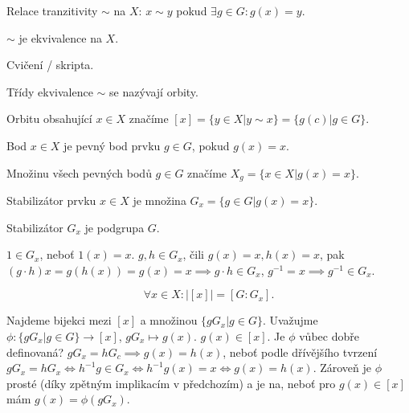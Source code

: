 \documentclass[12pt]{article}                   %
\begin{document}
        \begin{definice}
            Relace tranzitivity $\sim$ na $X$: $x \sim y$ pokud $\exists g \in G: g(x) = y$.
        \end{definice}

        \begin{lemma}
            $\sim$ je ekvivalence na $X$.

            \begin{dukazin}
                Cvičení / skripta.
            \end{dukazin}
        \end{lemma}

        \begin{definice}[Orbita]
            Třídy ekvivalence $\sim$ se nazývají orbity.

            Orbitu obsahující $x \in X$ značíme $[x] = \{y \in X | y \sim x\} = \{g(c) | g \in G\}$.
        \end{definice}

        \begin{definice}
            Bod $x \in X$ je pevný bod prvku $g \in G$, pokud $g(x) = x$.

            Množinu všech pevných bodů $g \in G$ značíme $X_g = \{x \in X | g(x) = x\}$.

            Stabilizátor prvku $x \in X$ je množina $G_x = \{g \in G | g(x) = x\}$.
        \end{definice}

        \begin{lemma}
            Stabilizátor $G_x$ je podgrupa $G$.

            \begin{dukazin}
                $1 \in G_x$, neboť $1(x) = x$. $g, h \in G_x$, čili $g(x) = x, h(x) = x$, pak $(g·h)x = g(h(x)) = g(x) = x \implies g·h \in G_x$, $g^{-1} = x \implies g^{-1} \in G_x$.
            \end{dukazin}
        \end{lemma}

        \begin{tvrzeni}
            $$ \forall x \in X: |[x]| = [G : G_x]. $$

            \begin{dukazin}
                Najdeme bijekci mezi $[x]$ a množinou $\{gG_x | g \in G\}$. Uvažujme $\phi: \{gG_x | g \in G\} \rightarrow [x]$, $gG_x \mapsto g(x)$. $g(x) \in [x]$. Je $\phi$ vůbec dobře definovaná? $gG_x = hG_c \implies g(x) = h(x)$, neboť podle dřívějšího tvrzení $gG_x = hG_x \Leftrightarrow h^{-1}g \in G_x \Leftrightarrow h^{-1}g(x) = x \Leftrightarrow g(x) = h(x)$. Zároveň je $\phi$ prosté (díky zpětným implikacím v předchozím) a je na, neboť pro $g(x) \in [x]$ mám $g(x) = \phi(gG_x)$.
            \end{dukazin}
        \end{tvrzeni}
\end{document}
